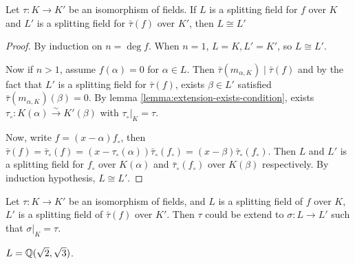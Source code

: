 \begin{theorem} \label{thm:two-splitting-field-are-isom}
  Let $\tau: K \to K'$ be an isomorphism of fields.
  If $L$ is a splitting field for $f$ over $K$ and $L'$ is a splitting field for $\bar\tau(f)$
  over $K'$, then $L \cong L'$

\begin{proof} \label{coro:extension-exists-splitting-field}
  By induction on $n = \deg f$. When $n = 1$, $L = K, L' = K'$, so $L \cong L'$.

  Now if $n > 1$, assume $f(\alpha) = 0$ for $\alpha \in L$. Then $\bar\tau(m_{\alpha, K}) \mid \bar\tau(f)$
  and by the fact that $L'$ is a splitting field for $\bar\tau(f)$, exists $\beta \in L'$ satisfied
  $\bar\tau(m_{\alpha, K})(\beta) = 0$. By lemma \ref{lemma:extension-exists-condition}, exists $\tau_{\circ}:
  K(\alpha) \xrightarrow\sim K'(\beta)$ with $\tau_\circ \big|_K = \tau$.

  Now, write $f = (x - \alpha) f_\circ$, then $\bar\tau(f) = \bar\tau_\circ(f) = (x - \tau_\circ(\alpha))
  \bar\tau_\circ(f_\circ) = (x - \beta) \bar\tau_\circ(f_\circ)$. Then $L$ and $L'$ is a splitting
  field for $f_{\circ}$ over $K(\alpha)$ and $\bar\tau_\circ(f_\circ)$ over $K(\beta)$ respectively.
  By induction hypothesis, $L \cong L'$.
\end{proof}
\end{theorem}

\begin{coro}
  Let $\tau: K \to K'$ be an isomorphism of fields, and
  $L$ is a splitting field of $f$ over $K$, $L'$ is a splitting field of $\bar\tau(f)$ over $K'$.
  Then $\tau$ could be extend to $\sigma: L \to L'$ such that $\sigma\big|_K = \tau$.
\end{coro}

\begin{example}
  $L = \mathbb{Q}(\sqrt{2}, \sqrt{3})$.
\end{example}
